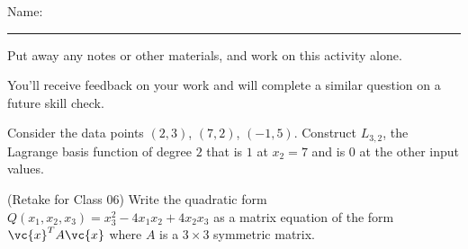 \documentclass[12pt,letterpaper,noanswers]{exam}
\begin{document}
 \pdfpageheight 11in 
  \pdfpagewidth 8.5in

\noindent Name: \rule{2.5in}{0.5pt}

\noindent Put away any notes or other materials, and work on this activity alone.

\noindent You'll receive feedback on your work and will complete a similar question on a future skill check.


\begin{questions}
\item Consider the data points $(2,3)$, $(7, 2)$, $(-1, 5)$.  Construct $L_{3,2}$, the Lagrange basis function of degree $2$ that is $1$ at $x_2 = 7$ and is $0$ at the other input values.

\vspace{6cm}

\item (Retake for Class 06)
Write the quadratic form $Q(x_1,x_2,x_3) = x_3^2 - 4x_1x_2 + 4x_2x_3$ as a matrix equation of the form $\vc{x}^TA\vc{x}$ where $A$ is a $3\times 3$ symmetric matrix.

\end{questions}
\end{document}
